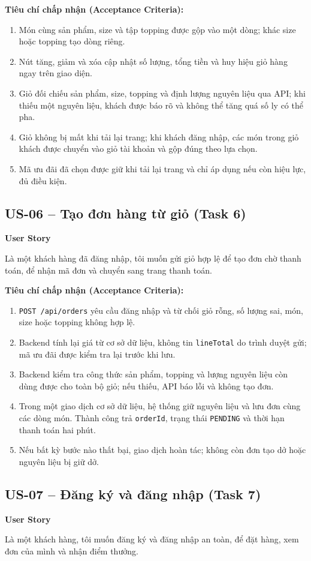 \textbf{Tiêu chí chấp nhận (Acceptance Criteria):}
\begin{enumerate}
  \item Món cùng sản phẩm, size và tập topping được gộp vào một dòng; khác size hoặc topping tạo dòng riêng.
  \item Nút tăng, giảm và xóa cập nhật số lượng, tổng tiền và huy hiệu giỏ hàng ngay trên giao diện.
  \item Giỏ đối chiếu sản phẩm, size, topping và định lượng nguyên liệu qua API; khi thiếu một nguyên liệu, khách được báo rõ và không thể tăng quá số ly có thể pha.
  \item Giỏ không bị mất khi tải lại trang; khi khách đăng nhập, các món trong giỏ khách được chuyển vào giỏ tài khoản và gộp đúng theo lựa chọn.
  \item Mã ưu đãi đã chọn được giữ khi tải lại trang và chỉ áp dụng nếu còn hiệu lực, đủ điều kiện.
\end{enumerate}

\subsection{US-06 -- Tạo đơn hàng từ giỏ (Task 6)}
\textbf{User Story}\par
Là một khách hàng đã đăng nhập, tôi muốn gửi giỏ hợp lệ để tạo đơn chờ thanh toán, để nhận mã đơn và chuyển sang trang thanh toán.

\textbf{Tiêu chí chấp nhận (Acceptance Criteria):}
\begin{enumerate}
  \item \texttt{POST /api/orders} yêu cầu đăng nhập và từ chối giỏ rỗng, số lượng sai, món, size hoặc topping không hợp lệ.
  \item Backend tính lại giá từ cơ sở dữ liệu, không tin \texttt{lineTotal} do trình duyệt gửi; mã ưu đãi được kiểm tra lại trước khi lưu.
  \item Backend kiểm tra công thức sản phẩm, topping và lượng nguyên liệu còn dùng được cho toàn bộ giỏ; nếu thiếu, API báo lỗi và không tạo đơn.
  \item Trong một giao dịch cơ sở dữ liệu, hệ thống giữ nguyên liệu và lưu đơn cùng các dòng món. Thành công trả \texttt{orderId}, trạng thái \texttt{PENDING} và thời hạn thanh toán hai phút.
  \item Nếu bất kỳ bước nào thất bại, giao dịch hoàn tác; không còn đơn tạo dở hoặc nguyên liệu bị giữ dở.
\end{enumerate}

\subsection{US-07 -- Đăng ký và đăng nhập (Task 7)}
\textbf{User Story}\par
Là một khách hàng, tôi muốn đăng ký và đăng nhập an toàn, để đặt hàng, xem đơn của mình và nhận điểm thưởng.

